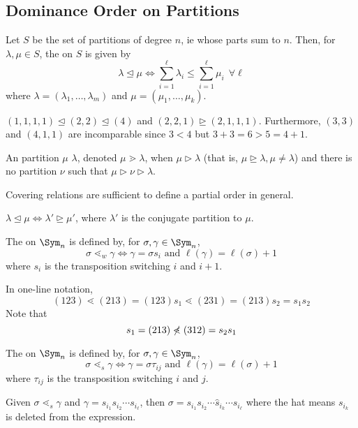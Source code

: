 \documentclass[11pt,leqno,oneside]{amsart}
\numberwithin{thm}{section}
\newcommand{\dominates}{\mathrel{\unrhd}}
\newcommand{\strictlydominates}{\mathrel{\rhd}}
\newcommand{\dominatedby}{\mathrel{\unlhd}}
\newcommand{\covers}{\mathrel{\gtrdot}}
\newcommand{\coveredby}{\mathrel{\lessdot}}
\begin{document}
\subsection{Dominance Order on Partitions}
\begin{defn}
  Let \(S\) be the set of partitions of degree \(n\), ie whose parts
  sum to \(n\). Then, for \(\lambda,\mu \in S\), the  on \(S\) is given by \[
    \lambda \dominatedby \mu \iff \sum_{i=1}^\ell \lambda_i \leq
    \sum_{i=1}^\ell \mu_i \ \ \forall \ell
  \]
  where \(\lambda = (\lambda_1, \ldots, \lambda_m)\) and \(\mu =
  (\mu_1, \ldots, \mu_k)\).
\end{defn}
\begin{example}
  \((1,1,1,1) \dominatedby (2,2) \dominatedby (4)\) and \((2,2,1)
  \dominates (2,1,1,1)\). Furthermore, \((3,3)\) and \((4,1,1)\) are
  incomparable since \(3 < 4\) but \(3+3=6>5=4+1\).
\end{example}
\begin{defn}
  An partition \(\mu\)  \(\lambda\), denoted \(\mu \covers
  \lambda\),  when \(\mu
  \strictlydominates \lambda\) (that is, \(\mu \dominates \lambda, \mu
  \neq \lambda\)) and there is no partition \(\nu\) such that \(\mu
  \strictlydominates \nu \strictlydominates \lambda\).
\end{defn}
\begin{rmk}
  Covering relations are sufficient to define a partial order in
  general. 
\end{rmk}
\begin{prop}
  \(\lambda \dominatedby \mu \iff \lambda' \dominates \mu'\), where
  \(\lambda'\) is the conjugate partition to \(\mu\).
\end{prop}
\begin{defn}
  The  on \(\Sym_n\) is defined by, for \(\sigma,
  \gamma \in \Sym_n\), \[
    \sigma \coveredby_w \gamma \iff \gamma = \sigma s_i \text{ and
    }\ell(\gamma) = \ell(\sigma)+1
  \]
  where \(s_i\) is the transposition switching \(i\) and \(i+1\).
\end{defn}
\begin{example}
  In one-line notation, \[
    (123) \coveredby (213) = (123)s_1 \coveredby (231) = (213)s_2 = s_1s_2
  \]
  Note that \[
    s_1 = (213) \not\coveredby (312) = s_2s_1
  \]
\end{example}
\begin{defn}
  The  on \(\Sym_n\) is defined by, for
  \(\sigma, \gamma \in \Sym_n\), \[
    \sigma \coveredby_s \gamma \iff \gamma = \sigma \tau_{ij} \text{ and
    } \ell(\gamma) = \ell(\sigma)+1
  \]
  where \(\tau_{ij}\) is the transposition switching \(i\) and \(j\).
\end{defn}
\begin{thm}
  Given \(\sigma \coveredby_s \gamma\) and \(\gamma = s_{i_1} s_{i_2}
  \cdots s_{i_\ell}\), then \(\sigma = s_{i_1} s_{i_2} \cdots
  \hat{s}_{i_k} \cdots s_{i_\ell}\) where the hat means \(s_{i_k}\) is
  deleted from the expression.
\end{thm}
\end{document}
